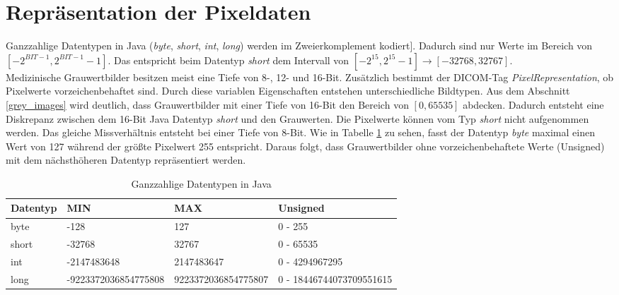 \FloatBarrier
\section{Repräsentation der Pixeldaten}

Ganzzahlige Datentypen in Java (\textit{byte}, \textit{short}, \textit{int}, \textit{long}) werden im Zweierkomplement kodiert\cite[S.106]{java:insel}]. Dadurch sind nur Werte im Bereich von $[-2^{BIT-1}, 2^{BIT-1}-1]$. Das entspricht beim Datentyp \textit{short} dem Intervall von $[-2^{15}, 2^{15}-1] \rightarrow [-32768, 32767]$.\\
Medizinische Grauwertbilder besitzen meist eine Tiefe von 8-, 12- und 16-Bit. Zusätzlich bestimmt der DICOM-Tag \textit{PixelRepresentation}, ob Pixelwerte vorzeichenbehaftet sind. Durch diese variablen Eigenschaften entstehen unterschiedliche Bildtypen. Aus dem Abschnitt \ref{grey_images} wird deutlich, dass Grauwertbilder mit einer Tiefe von 16-Bit den Bereich von $[0,65535]$ abdecken. Dadurch entsteht eine Diskrepanz zwischen dem 16-Bit Java Datentyp \textit{short} und den Grauwerten. Die Pixelwerte können vom Typ \textit{short} nicht aufgenommen werden. Das gleiche Missverhältnis entsteht bei einer Tiefe von 8-Bit. Wie in Tabelle \ref{java:datentypen} zu sehen, fasst der Datentyp \textit{byte} maximal einen Wert von 127 während der größte Pixelwert 255 entspricht. Daraus folgt, dass Grauwertbilder ohne vorzeichenbehaftete Werte (Unsigned) mit dem nächsthöheren Datentyp repräsentiert werden.

\begin{table}
    \begin{tabularx}{\textwidth}{|X|X|X|X|}
    \toprule
    \hline
    \textbf{Datentyp}         & \textbf{MIN}    & \textbf{MAX}& \textbf{Unsigned} \\ \hline
    byte 		 			  & -128					& 127 		  & 0 - 255\\ \hline
    short 		 			  & -32768				& 32767 		  	  & 	0 - 65535\\ \hline
    int						  & -2147483648		& 2147483647 		  & 0 - 4294967295\\ \hline
    long 				      & \tiny{-9223372036854775808}			& \tiny{9223372036854775807} 		  & \tiny{0 - 18446744073709551615}\\ \hline

    \bottomrule
    \end{tabularx}
    \caption {Ganzzahlige Datentypen in Java}
    \label{java:datentypen}
\end{table}

